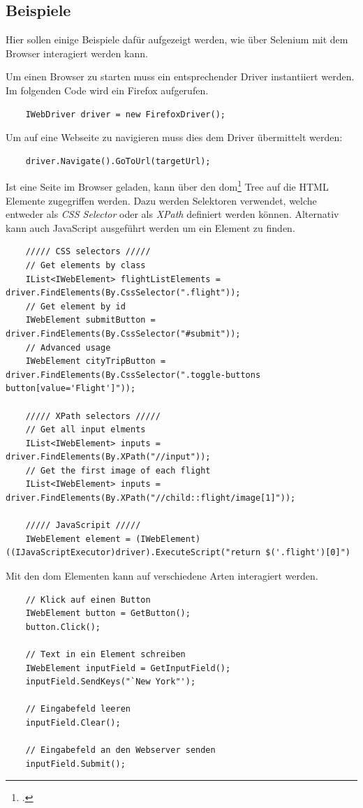 \subsection{Beispiele}
Hier sollen einige Beispiele dafür aufgezeigt werden, wie über Selenium mit dem Browser interagiert werden kann.

Um einen Browser zu starten muss ein entsprechender Driver instantiiert werden. Im folgenden Code wird ein Firefox aufgerufen.
\lstset{language=csh}
\begin{lstlisting}
	IWebDriver driver = new FirefoxDriver();
\end{lstlisting}

Um auf eine Webseite zu navigieren muss dies dem Driver übermittelt werden:
\begin{lstlisting}
	driver.Navigate().GoToUrl(targetUrl);
\end{lstlisting}

Ist eine Seite im Browser geladen, kann über den \gls{dom}\footcite{Document_Object_Model} Tree auf die HTML Elemente zugegriffen werden. Dazu werden Selektoren verwendet, welche entweder als \textit{CSS Selector} oder als \textit{XPath} definiert werden können. Alternativ kann auch JavaScript ausgeführt werden um ein Element zu finden.
\begin{lstlisting}
	///// CSS selectors /////
	// Get elements by class
	IList<IWebElement> flightListElements = driver.FindElements(By.CssSelector(".flight"));
	// Get element by id 
	IWebElement submitButton = driver.FindElements(By.CssSelector("#submit")); 
	// Advanced usage
	IWebElement cityTripButton = driver.FindElements(By.CssSelector(".toggle-buttons button[value='Flight']")); 
	
	///// XPath selectors /////
	// Get all input elments
	IList<IWebElement> inputs = driver.FindElements(By.XPath("//input")); 
	// Get the first image of each flight
	IList<IWebElement> inputs = driver.FindElements(By.XPath("//child::flight/image[1]")); 
	
	///// JavaScripit /////
	IWebElement element = (IWebElement) ((IJavaScriptExecutor)driver).ExecuteScript("return $('.flight')[0]")
\end{lstlisting}

Mit den \gls{dom} Elementen kann auf verschiedene Arten interagiert werden.

\begin{lstlisting}
	// Klick auf einen Button
	IWebElement button = GetButton();
	button.Click();
	
	// Text in ein Element schreiben
	IWebElement inputField = GetInputField();
	inputField.SendKeys("`New York"');
	
	// Eingabefeld leeren
	inputField.Clear();
	
	// Eingabefeld an den Webserver senden
	inputField.Submit();
\end{lstlisting}

